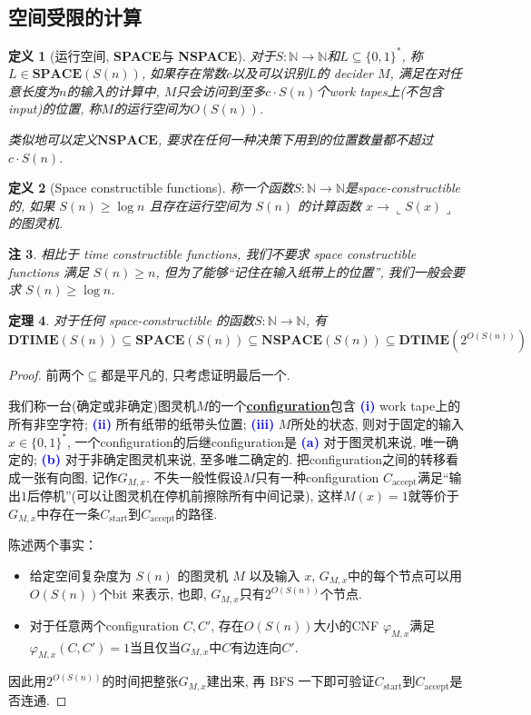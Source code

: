 \documentclass[8pt]{article}
\theoremstyle{compact}
\newtheorem{theorem}{定理}[section]
\newtheorem{definition}[theorem]{定义}
\newtheorem{remark}[theorem]{注}
\def\obj#1{\textbf{\uline{#1}}}
\def\num#1{\textnormal{\textbf{\mbox{\textcolor{blue}{(#1)}}}}}
\def\ge{\geqslant}
\def\rep#1{\llcorner{#1}\lrcorner}
\def\DTIME{\textbf{DTIME}}
\def\SPACE{\textbf{SPACE}}
\def\NSPACE{\textbf{NSPACE}}
\begin{document}
\subsection{空间受限的计算}
\begin{definition}[运行空间, \SPACE 与 \NSPACE]
	对于$S: \mathbb N \to \mathbb N$和$L \subseteq \{0, 1\}^*$, 称$L \in \SPACE(S(n))$, 如果存在常数$c$以及可以识别$L$的 decider $M$, 满足在对任意长度为$n$的输入的计算中, $M$只会访问到至多$c \cdot S(n)$个work tapes上(不包含input)的位置, 称$M$的运行空间为$O(S(n))$. 

	类似地可以定义$\NSPACE$, 要求在任何一种决策下用到的位置数量都不超过$c \cdot S(n)$. 
\end{definition}
\begin{definition}[Space constructible functions]
	称一个函数$S: \mathbb N \to \mathbb N$是space-constructible的, 如果 $S(n) \ge \log n$ 且存在运行空间为 $S(n)$ 的计算函数 $x \to \rep{S(x)}$ 的图灵机.
\end{definition}
\begin{remark}
	相比于 time constructible functions, 我们不要求 space constructible functions 满足 $S(n) \ge n$, 但为了能够“记住在输入纸带上的位置”, 我们一般会要求 $S(n) \ge \log n$. 
\end{remark}
\begin{theorem}
	对于任何 space-constructible 的函数$S: \mathbb N \to \mathbb N$, 有
	$$\DTIME(S(n)) \subseteq \SPACE(S(n)) \subseteq \NSPACE(S(n)) \subseteq \DTIME(2^{O(S(n))})$$
	\label{time_and_space}
\end{theorem}
\begin{proof}
	前两个$\subseteq$都是平凡的, 只考虑证明最后一个. 

	我们称一台(确定或非确定)图灵机$M$的一个\obj{configuration}包含 \num{i} work tape上的所有非空字符; \num{ii} 所有纸带的纸带头位置; \num{iii} $M$所处的状态, 则对于固定的输入$x \in \{0, 1\}^*$, 一个configuration的后继configuration是 \num{a} 对于图灵机来说, 唯一确定的; \num{b} 对于非确定图灵机来说, 至多唯二确定的. 把configuration之间的转移看成一张有向图, 记作$G_{M, x}$. 不失一般性假设$M$只有一种configuration $C_{\text{accept}}$满足“输出$1$后停机”(可以让图灵机在停机前擦除所有中间记录), 这样$M(x) = 1$就等价于$G_{M, x}$中存在一条$C_{\text{start}}$到$C_{\text{accept}}$的路径. 

	陈述两个事实：
	\begin{itemize}
		\item 给定空间复杂度为 $S(n)$ 的图灵机 $M$ 以及输入 $x$, $G_{M, x}$中的每个节点可以用$O(S(n))$个bit 来表示, 也即, $G_{M, x}$只有$2^{O(S(n))}$个节点. 
		\item 对于任意两个configuration $C, C'$, 存在$O(S(n))$大小的CNF $\varphi_{M, x}$满足$\varphi_{M, x}(C, C') = 1$当且仅当$G_{M, x}$中$C$有边连向$C'$. 
	\end{itemize}

	因此用$2^{O(S(n))}$的时间把整张$G_{M, x}$建出来, 再 BFS 一下即可验证$C_{\text{start}}$到$C_{\text{accept}}$是否连通. 
\end{proof}
\end{document}
